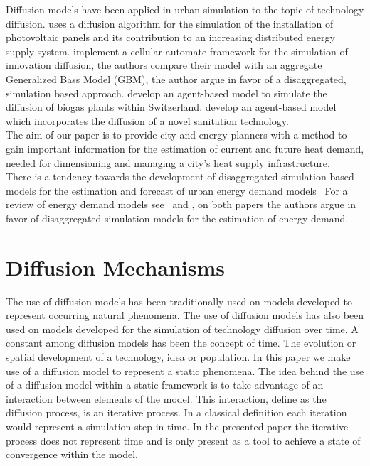 Diffusion models have been applied in urban simulation to the topic of
technology diffusion.  uses a diffusion algorithm for the
simulation of the installation of photovoltaic panels and its contribution to
an increasing distributed energy supply system. 
implement a cellular automate framework for the simulation of innovation
diffusion, the authors compare their model with an aggregate Generalized Bass
Model (GBM), the author argue in favor of a disaggregated, simulation based
approach.
 develop an agent-based model to simulate the diffusion of
biogas plants within Switzerland.  develop an agent-based
model which incorporates the diffusion of a novel sanitation technology.\\

The aim of our paper is to provide city and energy planners with a method to
gain important information for the estimation of current and future heat
demand, needed for dimensioning and managing a city's  heat supply
infrastructure.\\ 

There is a tendency towards the development of disaggregated simulation based
models for the estimation and forecast of urban energy demand
models~\cite{Balaras.2007, Kavgic.2010, Dascalaki.2010, Dascalaki.2011,
DallO.2012, Caputo.2013, Hrabovszky.2013, Kragh.2013, Singh.2013}
%
For a review of energy demand models see~ and 
, on both papers the authors argue in favor of disaggregated
simulation models for the estimation of energy demand.\\
 

\section{Diffusion Mechanisms}

The use of diffusion models has been traditionally used on models developed to
represent occurring natural phenomena.
The use of diffusion models has also been used on models developed for the
simulation of technology diffusion over time. 
%
A constant among diffusion models has been the concept of time. The evolution
or spatial development of a technology, idea or population.
In this paper we make use of a diffusion model to represent a static phenomena.
The idea behind the use of a diffusion model within a static framework is to
take advantage of an interaction between elements of the model.
This interaction, define as the diffusion process, is an iterative process. In
a classical definition each iteration would represent a simulation step in
time.
In the presented paper the iterative process does not represent time and is
only present as a tool to achieve a state of convergence within the model.\\

